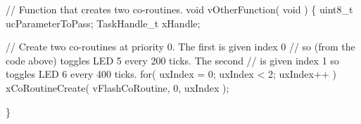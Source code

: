 \begin{DoxyPre}// Function that creates two co-routines.
void vOtherFunction( void )
\{
uint8\_t ucParameterToPass;
TaskHandle\_t xHandle;
\begin{DoxyVerb}// Create two co-routines at priority 0.  The first is given index 0
// so (from the code above) toggles LED 5 every 200 ticks.  The second
// is given index 1 so toggles LED 6 every 400 ticks.
for( uxIndex = 0; uxIndex < 2; uxIndex++ )
{
    xCoRoutineCreate( vFlashCoRoutine, 0, uxIndex );
}
\end{DoxyVerb}

\}
  \end{DoxyPre}
 